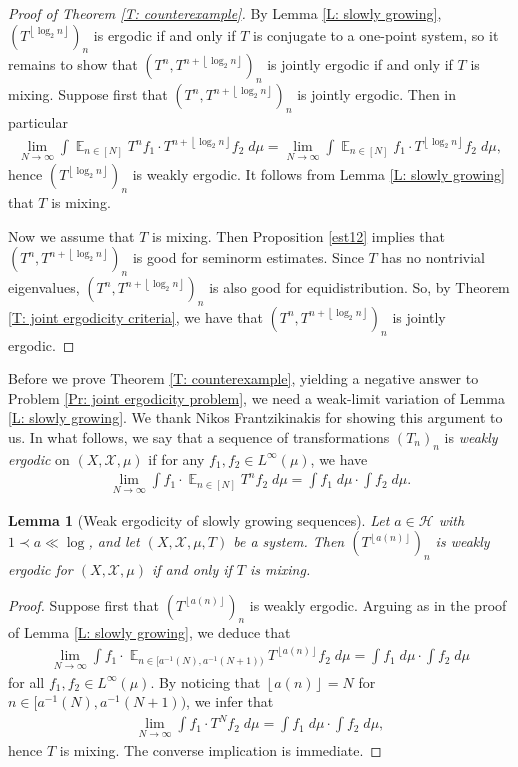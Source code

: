 \documentclass[11pt]{amsart}
\newtheorem{lemma}{Lemma}[section]
\theoremstyle{definition}
\DeclareMathOperator*{\E}{\mathbb{E}}
\newcommand{\CH}{{\mathcal H}}
\newcommand{\CX}{{\mathcal X}}
\newcommand{\inv}{^{-1}}
\newcommand{\1}{{\mathbf{1}}}
\newcommand{\floor}[1]{{\left \lfloor #1 \right \rfloor}}
\begin{document}
\begin{proof}[Proof of Theorem \ref{T: counterexample}]
    By Lemma \ref{L: slowly growing}, $(T^{\floor{\log_2 n}})_n$ is ergodic if and only if $T$ is conjugate to a one-point system, so it remains to show that $(T^n, T^{n+\floor{\log_2 n}})_n$ is jointly ergodic if and only if $T$ is mixing.  Suppose first that $(T^n, T^{n+\floor{\log_2 n}})_n$ is jointly ergodic. Then in particular
    \begin{align*}
        \lim_{N\to\infty}\int \E_{n\in[N]}T^n f_1\cdot T^{n+\floor{\log_2 n}}f_2\; d\mu = \lim_{N\to\infty}\int \E_{n\in[N]} f_1\cdot T^{\floor{\log_2 n}}f_2\; d\mu,
    \end{align*}
    hence $(T^{\floor{\log_2 n}})_n$ is weakly ergodic. It follows from Lemma \ref{L: slowly growing} that $T$ is mixing. 

    Now we assume that $T$ is mixing. Then Proposition \ref{est12} implies that $(T^n, T^{n+\floor{\log_2 n}})_n$ is good for seminorm estimates. Since $T$ has no nontrivial eigenvalues, $(T^n, T^{n+\floor{\log_2 n}})_n$ is also good for equidistribution. So, by Theorem \ref{T: joint ergodicity criteria}, we have that $(T^n, T^{n+\floor{\log_2 n}})_n$ is jointly ergodic.
\end{proof}


\iffalse

Before we prove Theorem \ref{T: counterexample}, yielding a negative answer to Problem \ref{Pr: joint ergodicity problem}, we need a weak-limit variation of Lemma \ref{L: slowly growing}. We thank Nikos Frantzikinakis for showing this argument to us. In what follows, we say that a sequence of transformations $(T_n)_n$ is \textit{weakly ergodic} on $(X, \CX, \mu)$ if for any $f_1,f_2\in L^\infty(\mu)$, we have
\begin{align*}
    \lim_{N\to\infty}\int f_1\cdot \E_{n\in[N]}T^n f_2\; d\mu = \int f_1\; d\mu\cdot\int f_2\; d\mu.
\end{align*}
\begin{lemma}[Weak ergodicity of slowly growing sequences]\label{L: slowly growing weak}
    Let $a\in\CH$ with $1\prec a\ll \log$, and let $(X, \CX, \mu, T)$ be a system. Then $(T^{\floor{a(n)}})_n$ is weakly ergodic for $(X, \CX, \mu)$ if and only if $T$ is mixing.
\end{lemma}
\begin{proof}
Suppose first that $(T^{\floor{a(n)}})_n$ is weakly ergodic. Arguing as in the proof of Lemma \ref{L: slowly growing}, we deduce that
\begin{align*}
    \lim_{N\to\infty}\int f_1\cdot \E_{n\in[a\inv(N), a\inv(N+1))}T^{\floor{a(n)}}f_2\; d\mu = \int f_1\; d\mu\cdot \int f_2\; d\mu
\end{align*}
for all $f_1,f_2\in L^\infty(\mu)$. By noticing that $\floor{a(n)} = N$ for $n\in [a\inv(N), a\inv(N+1))$, we infer that
\begin{align*}
    \lim_{N\to\infty}\int f_1\cdot T^N f_2\; d\mu = \int f_1\; d\mu\cdot \int f_2\; d\mu,
\end{align*}
hence $T$ is mixing. The converse implication is immediate. 
\end{proof}
\end{document}

